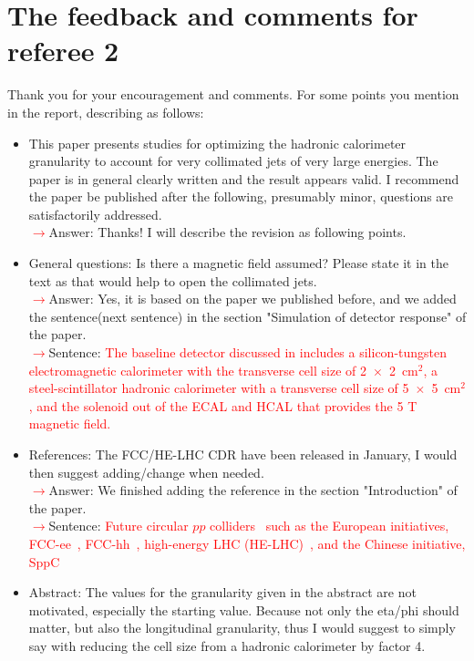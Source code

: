 \documentclass[final,1p,11pt]{elsarticle}
\begin{document}
\section{The feedback and comments for referee 2}
Thank you for your encouragement and comments. For some points you mention in the report, describing as follows:\\
\begin{itemize}
\item This paper presents studies for optimizing the hadronic calorimeter granularity to account for very collimated jets of very large energies.
The paper is in general clearly written and the result appears valid. I recommend the paper be published after the following, presumably minor, questions are satisfactorily addressed.\\
 \textcolor{red}{$\rightarrow$}Answer: Thanks! I will describe the revision as following points.\\
\item General questions: Is there a magnetic field assumed? Please state it in the text as that would help to open the collimated jets.\\
 \textcolor{red}{$\rightarrow$}Answer: Yes, it is based on the paper we published before, and we added the sentence(next sentence) in the section "Simulation of detector response" of the paper.\\
 \textcolor{red}{$\rightarrow$}Sentence: \textcolor{red}{The baseline detector discussed in \cite{Chekanov:2016ppq}
includes a silicon-tungsten electromagnetic calorimeter with the transverse cell size of 2~$\times$~2~cm$^2$, a steel-scintillator hadronic calorimeter with a transverse cell size of 5~$\times$~5~cm$^2$, and the solenoid out of the ECAL and HCAL that provides the 5 T magnetic field.}
\item References: The FCC/HE-LHC CDR have been released in January, I would then suggest adding/change when needed.\\
 \textcolor{red}{$\rightarrow$}Answer: We finished adding the reference in the section "Introduction" of the paper.\\
 \textcolor{red}{$\rightarrow$}Sentence: \textcolor{red}{Future circular $pp$ colliders~\cite{Mangano:2018mur} such as the European initiatives, FCC-ee~\cite{Benedikt:2651299}, FCC-hh~\cite{Benedikt:2018csr}, high-energy LHC (HE-LHC)~\cite{Zimmermann:2018wdi}, and the Chinese initiative, SppC~\cite{Tang:2015qga} }
\item Abstract: The values for the granularity given in the abstract are not motivated, especially the starting value. Because not only the eta/phi should matter, but also the longitudinal granularity, thus I would suggest to simply say with reducing the cell size from a hadronic calorimeter by factor 4.\\

\end{itemize}
\end{document}
